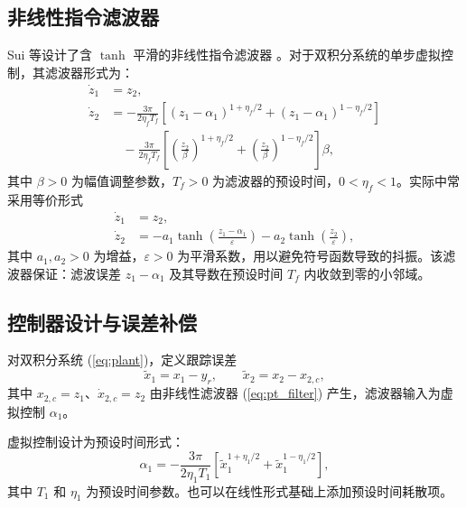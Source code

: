 \documentclass[UTF8,a4paper,11pt]{ctexart}
\begin{document}
\subsection{非线性指令滤波器}

Sui 等设计了含 $\tanh$ 平滑的非线性指令滤波器 \cite{Sui2024Predefined}。对于双积分系统的单步虚拟控制，其滤波器形式为：
\begin{equation}
\label{eq:pt_filter}
\begin{aligned}
\dot{z}_1 &= z_2, \\
\dot{z}_2 &= -\frac{3\pi}{2\eta_f T_f}
\left[ (z_1 - \alpha_1)^{1+\eta_f/2} + (z_1 - \alpha_1)^{1-\eta_f/2} \right] \\
&\quad -\frac{3\pi}{2\eta_f T_f}
\left[ \left(\frac{z_2}{\beta}\right)^{1+\eta_f/2} + \left(\frac{z_2}{\beta}\right)^{1-\eta_f/2} \right]\beta,
\end{aligned}
\end{equation}
其中 $\beta > 0$ 为幅值调整参数，$T_f > 0$ 为滤波器的预设时间，$0 < \eta_f < 1$。实际中常采用等价形式
\begin{equation}
\label{eq:pt_filter_tanh}
\begin{aligned}
\dot{z}_1 &= z_2, \\
\dot{z}_2 &= -a_1 \tanh\left( \frac{z_1 - \alpha_1}{\varepsilon} \right)
           - a_2 \tanh\left( \frac{z_2}{\varepsilon} \right),
\end{aligned}
\end{equation}
其中 $a_1, a_2 > 0$ 为增益，$\varepsilon > 0$ 为平滑系数，用以避免符号函数导致的抖振。该滤波器保证：滤波误差 $z_1 - \alpha_1$ 及其导数在预设时间 $T_f$ 内收敛到零的小邻域。

\subsection{控制器设计与误差补偿}

对双积分系统 (\ref{eq:plant})，定义跟踪误差
\begin{equation}
\tilde{x}_1 = x_1 - y_r, \qquad \tilde{x}_2 = x_2 - x_{2,c},
\end{equation}
其中 $x_{2,c} = z_1$、$\dot{x}_{2,c} = z_2$ 由非线性滤波器 (\ref{eq:pt_filter}) 产生，滤波器输入为虚拟控制 $\alpha_1$。

虚拟控制设计为预设时间形式：
\begin{equation}
\alpha_1 = - \frac{3\pi}{2\eta_1 T_1}
\left[ \tilde{x}_1^{1+\eta_1/2} + \tilde{x}_1^{1-\eta_1/2} \right],
\end{equation}
其中 $T_1$ 和 $\eta_1$ 为预设时间参数。也可以在线性形式基础上添加预设时间耗散项。
\end{document}
